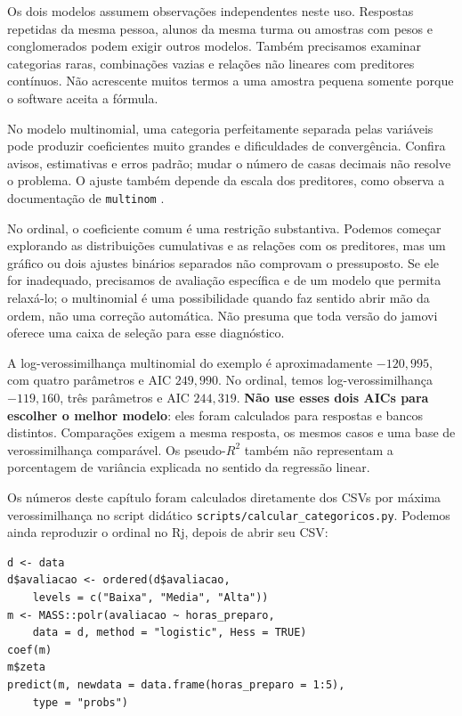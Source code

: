 Os dois modelos assumem observações independentes neste uso. Respostas repetidas da mesma pessoa, alunos da mesma turma ou amostras com pesos e conglomerados podem exigir outros modelos. Também precisamos examinar categorias raras, combinações vazias e relações não lineares com preditores contínuos. Não acrescente muitos termos a uma amostra pequena somente porque o software aceita a fórmula.

No modelo multinomial, uma categoria perfeitamente separada pelas variáveis pode produzir coeficientes muito grandes e dificuldades de convergência. Confira avisos, estimativas e erros padrão; mudar o número de casas decimais não resolve o problema. O ajuste também depende da escala dos preditores, como observa a documentação de \texttt{multinom} \parencite{RMultinom}.

No ordinal, o coeficiente comum é uma restrição substantiva. Podemos começar explorando as distribuições cumulativas e as relações com os preditores, mas um gráfico ou dois ajustes binários separados não comprovam o pressuposto. Se ele for inadequado, precisamos de avaliação específica e de um modelo que permita relaxá-lo; o multinomial é uma possibilidade quando faz sentido abrir mão da ordem, não uma correção automática. Não presuma que toda versão do jamovi oferece uma caixa de seleção para esse diagnóstico.

A log-verossimilhança multinomial do exemplo é aproximadamente $-120{,}995$, com quatro parâmetros e AIC $249{,}990$. No ordinal, temos log-verossimilhança $-119{,}160$, três parâmetros e AIC $244{,}319$. \textbf{Não use esses dois AICs para escolher o melhor modelo}: eles foram calculados para respostas e bancos distintos. Comparações exigem a mesma resposta, os mesmos casos e uma base de verossimilhança comparável. Os pseudo-$R^2$ também não representam a porcentagem de variância explicada no sentido da regressão linear.

Os números deste capítulo foram calculados diretamente dos CSVs por máxima verossimilhança no script didático \texttt{scripts/calcular\_categoricos.py}. Podemos ainda reproduzir o ordinal no Rj, depois de abrir seu CSV:
\begin{verbatim}
d <- data
d$avaliacao <- ordered(d$avaliacao,
    levels = c("Baixa", "Media", "Alta"))
m <- MASS::polr(avaliacao ~ horas_preparo,
    data = d, method = "logistic", Hess = TRUE)
coef(m)
m$zeta
predict(m, newdata = data.frame(horas_preparo = 1:5),
    type = "probs")
\end{verbatim}

